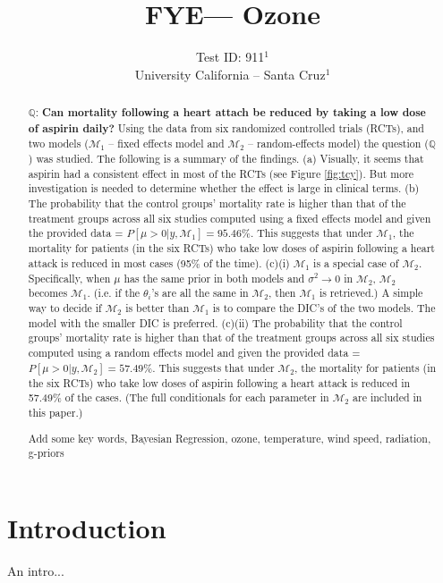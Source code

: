 \documentclass{../../tex_template/asaproc}
\title{FYE--- Ozone}
\author{
  Test ID: 911$^1$\\
  University California -- Santa Cruz$^1$\\
}
\newcommand{\bk}[1]{\left[#1\right]}
\newcommand{\M}{\mathcal{M}}
\newcommand{\Q}{\mathbb{Q}}
\begin{document}
\maketitle
\begin{abstract}
$\Q$: \textbf{Can mortality following a heart attach be reduced by taking a low
dose of aspirin daily?} Using the data from six randomized controlled trials
(RCTs), and two models ($\M_1$ -- fixed effects model and $\M_2$ --
random-effects model) the question ($\Q$) was studied. The following is a
summary of the findings. (a) Visually, it seems that aspirin had a consistent
effect in most of the RCTs (see Figure \ref{fig:tcy}). But more investigation
is needed to determine whether the effect is large in clinical terms. (b) The
probability that the control groups' mortality rate is higher than that of the
treatment groups across all six studies computed using a fixed effects model
and given the provided data = $P\bk{\mu > 0 | y, \M_1} = 95.46\%$. This
suggests that under $\M_1$, the mortality for patients (in the six RCTs) who
take low doses of aspirin following a heart attack is reduced in most cases
(95\% of the time). (c)(i) $\M_1$ is a special case of $\M_2$. Specifically,
when $\mu$ has the same prior in both models and $\sigma^2 \rightarrow 0$ in
$\M_2$, $\M_2$ becomes $\M_1$. (i.e. if the $\theta_i$'s are all the same in
$\M_2$, then $\M_1$ is retrieved.) A simple way to decide if $\M_2$ is better
than $\M_1$ is to compare the DIC's of the two models. The model with the
smaller DIC is preferred. (c)(ii) The probability that the control groups'
mortality rate is higher than that of the treatment groups across all six
studies computed using a random effects model and given the provided data =
$P\bk{\mu > 0 | y, \M_2} = 57.49\%$. This suggests that under $\M_2$, the
mortality for patients (in the six RCTs) who take low doses of aspirin
following a heart attack is reduced in 57.49\% of the cases. (The full
conditionals for each parameter in $\M_2$ are included in this paper.)

\begin{keywords}
Add some key words,
Bayesian Regression, ozone, temperature, wind speed, radiation, g-priors
\end{keywords}
\end{abstract}

\section{Introduction}
An intro...
\end{document}
